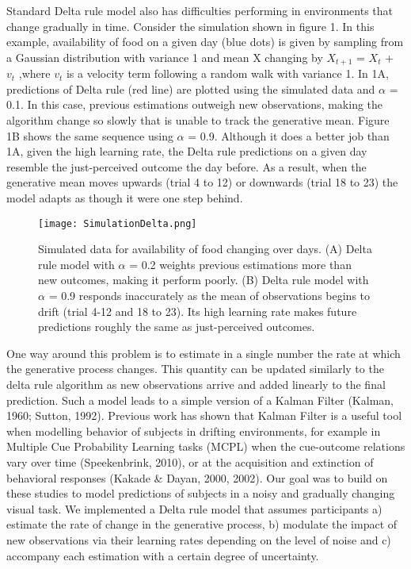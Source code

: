 \documentclass[jou,apacite]{apa6}
\begin{document}
Standard Delta rule model also has difficulties performing in environments that change gradually in time.  Consider the simulation shown in figure 1.  In this example, availability of food on a given day (blue dots) is given by sampling from a Gaussian distribution with variance 1 and mean X changing by $X_{t+1}$ = $X_t$ + $v_t$ ,where $v_t$  is a velocity term following a random walk with variance 1. In 1A, predictions of Delta rule (red line) are plotted using the simulated data and $\alpha$ = 0.1. In this case, previous estimations outweigh new observations, making the algorithm change so slowly that is unable to track the generative mean. Figure 1B shows the same sequence using $\alpha$ = 0.9. Although it does a better job than 1A, given the high learning rate, the Delta rule predictions on a given day resemble the just-perceived outcome the day before. As a result, when the generative mean moves upwards (trial 4 to 12) or downwards (trial 18 to 23) the model adapts as though it were one step behind. 

\begin{figure}[!ht]
\centering
\texttt{[image: SimulationDelta.png]}
\caption{Simulated data for availability of food changing over days. (A) Delta rule model with $\alpha$ = 0.2 weights previous estimations more than new outcomes, making it perform poorly. (B) Delta rule model with $\alpha$ = 0.9 responds inaccurately as the mean of observations begins to drift (trial 4-12 and 18 to 23). Its high learning rate makes future predictions roughly the same as just-perceived outcomes.}
\label{fig:hiperpro}
\end{figure}

One way around this problem is to estimate in a single number the rate at which the generative process changes. This quantity can be updated similarly to the delta rule algorithm as new observations arrive and added linearly to the final prediction. Such a model leads to a simple version of a Kalman Filter (Kalman, 1960; Sutton, 1992). Previous work has shown that Kalman Filter is a useful tool when modelling behavior of subjects in drifting environments, for example in Multiple Cue Probability Learning tasks (MCPL) when the cue-outcome relations vary over time (Speekenbrink, 2010), or at the acquisition and extinction of behavioral responses (Kakade \& Dayan, 2000, 2002). Our goal was to build on these studies to model predictions of subjects in a noisy and gradually changing visual task. We implemented a Delta rule model that assumes participants a) estimate the rate of change in the generative process, b) modulate the impact of new observations via their learning rates depending on the level of noise and c) accompany each estimation with a certain degree of uncertainty. 
\end{document}
